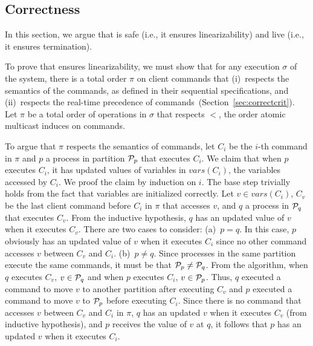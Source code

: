 \subsection{Correctness}
\label{sec:correctness}

In this section, we argue that \dynastar is safe (i.e., it ensures linearizability) and live (i.e., it ensures termination).

To prove that \dynastar ensures linearizability, we must show that for any execution $\sigma$ of the system, there is a total order $\pi$ on client commands that 
(i)~respects the semantics of the commands, as defined in their sequential specifications, and 
(ii)~respects the real-time precedence of commands~(Section~\ref{sec:correctcrit}).
%
Let $\pi$ be a total order of operations in $\sigma$ that respects $<$, the order atomic multicast induces on commands.

To argue that $\pi$ respects the semantics of  commands, let $C_i$ be the $i$-th command in $\pi$ and $p$ a process in partition $\mathcal{P}_p$ that executes $C_i$.
We claim that when $p$ executes $C_i$, it has updated values of variables in $vars(C_i)$, the variables accessed by $C_i$.
We proof the claim by induction on $i$.
The base step trivially holds from the fact that variables are initialized correctly.
Let $v \in vars(C_i)$, $C_v$ be the last client command before $C_i$ in $\pi$ that accesses $v$, and $q$ a process in $\mathcal{P}_q$ that executes $C_v$.
From the inductive hypothesis, $q$ has an updated value of $v$ when it executes $C_v$.
There are two cases to consider:
(a)~$p = q$. In this case, $p$ obviously has an updated value of $v$ when it executes $C_i$ since no other command accesses $v$ between $C_v$ and $C_i$.
(b)~$p \neq q$. 
Since processes in the same partition execute the same commands, it must be that $\mathcal{P}_p \neq \mathcal{P}_q$.
From the algorithm, when $q$ executes $C_v$, $v \in \mathcal{P}_q$ and when $p$ executes $C_i$, $v \in \mathcal{P}_p$.
Thus, $q$ executed a command to move $v$ to another partition after executing $C_v$ and $p$ executed a command to move $v$ to $\mathcal{P}_p$ before executing $C_i$.
Since there is no command that accesses $v$ between $C_v$ and $C_i$ in $\pi$, $q$ has an updated $v$ when it executes $C_v$ (from inductive hypothesis), and $p$ receives the value of $v$ at $q$, it follows that $p$ has an updated $v$ when it executes $C_i$.

